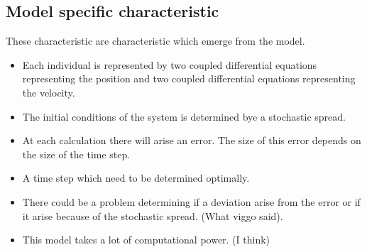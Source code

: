 \subsection{Model specific characteristic}
These characteristic are characteristic which emerge from the model.
\begin{itemize}
\item Each individual is represented by two coupled differential equations representing the position and two coupled differential equations representing the velocity.
\item The initial conditions of the system is determined bye a stochastic spread.
\item At each calculation there will arise an error. The size of this error depends on the size of the time step.
\item A time step which need to be determined optimally.

\item There could be a problem determining if a deviation arise from the error or if it arise because of the stochastic spread. (What viggo said).

\item This model takes a lot of computational power. (I think)

\end{itemize}


